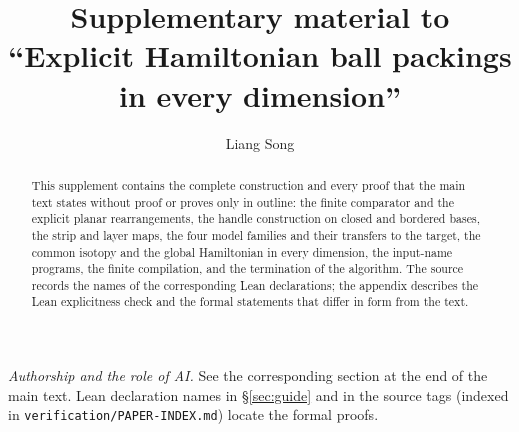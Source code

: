 \documentclass[11pt]{amsart}
\title[Supplement: explicit Hamiltonian ball packings]{Supplementary material to\\
``Explicit Hamiltonian ball packings in every dimension''}
\author{Liang Song}
\date{}
\begin{document}
\begin{abstract}
This supplement contains the complete construction and every proof that the main text states without proof or
proves only in outline: the finite comparator and the explicit planar rearrangements, the handle construction on
closed and bordered bases, the strip and layer maps, the four model families and their transfers to the target,
the common isotopy and the global Hamiltonian in every dimension, the input-name programs,
the finite compilation, and the termination of the algorithm. The source records the names of the corresponding Lean
declarations; the appendix describes the Lean explicitness check and the formal statements that differ in form from
the text.
\end{abstract}
\maketitle

\noindent\emph{Authorship and the role of AI.} See the corresponding section at the end of the main text.
Lean declaration names in \S\ref{sec:guide} and in the source tags (indexed in \texttt{verification/PAPER-INDEX.md})
locate the formal proofs.

\tableofcontents




























\appendix




\end{document}

